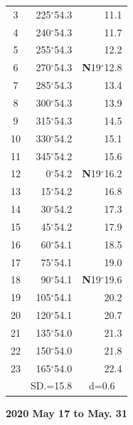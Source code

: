 \documentclass[10pt, a4paper]{report}
\begin{document}
\begin{scriptsize}
\begin{tabular*}{0.2\textwidth}[t]{@{\extracolsep{\fill}}|c|rr|}
3 & 225$^\circ$54.3 & \raisebox{0.24ex}{\boldmath$\cdot$~\boldmath$\cdot$~~}11.1\\
4 & 240$^\circ$54.3 & 11.7\\
5 & 255$^\circ$54.3 & 12.2\\[2Pt]
6 & 270$^\circ$54.3 & \textbf{N}19$^\circ$12.8\\
7 & 285$^\circ$54.3 & 13.4\\
8 & 300$^\circ$54.3 & 13.9\\
9 & 315$^\circ$54.3 & \raisebox{0.24ex}{\boldmath$\cdot$~\boldmath$\cdot$~~}14.5\\
10 & 330$^\circ$54.2 & 15.1\\
11 & 345$^\circ$54.2 & 15.6\\[2Pt]
12 & 0$^\circ$54.2 & \textbf{N}19$^\circ$16.2\\
13 & 15$^\circ$54.2 & 16.8\\
14 & 30$^\circ$54.2 & 17.3\\
15 & 45$^\circ$54.2 & \raisebox{0.24ex}{\boldmath$\cdot$~\boldmath$\cdot$~~}17.9\\
16 & 60$^\circ$54.1 & 18.5\\
17 & 75$^\circ$54.1 & 19.0\\[2Pt]
18 & 90$^\circ$54.1 & \textbf{N}19$^\circ$19.6\\
19 & 105$^\circ$54.1 & 20.2\\
20 & 120$^\circ$54.1 & 20.7\\
21 & 135$^\circ$54.0 & \raisebox{0.24ex}{\boldmath$\cdot$~\boldmath$\cdot$~~}21.3\\
22 & 150$^\circ$54.0 & 21.8\\
23 & 165$^\circ$54.0 & 22.4\\
\hline
\rule{0pt}{2.4ex} & \multicolumn{1}{c}{SD.=15.8} & \multicolumn{1}{c|}{d=0.6}\\
\hline
\end{tabular*}

\end{scriptsize}
\newpage
\sffamily
\noindent
\begin{flushright}
\textbf{2020 May 17 to May. 31}\par
\end{flushright}
\end{document}
